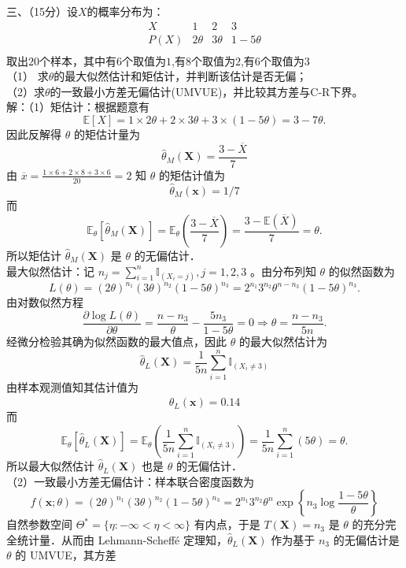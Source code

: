 \documentclass[UTF8]{ctexart}
\begin{document}
\noindent 三、（15分）设$X$的概率分布为：
\[
\begin{array}{c|ccc}
X & 1 & 2 & 3 \\ \hline
P(X) & 2\theta & 3\theta & 1-5\theta \\
\end{array}
\]
取出$20$个样本，其中有$6$个取值为$1$,有$8$个取值为$2$,有$6$个取值为$3$\\
（1） 求$\theta$的最大似然估计和矩估计，并判断该估计是否无偏；\\
（2）求$\theta$的一致最小方差无偏估计(UMVUE)，并比较其方差与C-R下界。\\
解：（1）矩估计：根据题意有
$$
\mathbb{E}[X]=1 \times 2 \theta+2 \times 3 \theta+3 \times(1-5 \theta)=3-7 \theta .
$$
因此反解得 $\theta$ 的矩估计量为
$$\hat{\theta}_M(\boldsymbol{X})=\frac{3-\overline{X}}{7}$$
由 $\overline{x}=\frac{1 \times 6+2 \times 8+3 \times 6}{20}=2$ 知 $\theta$ 的矩估计值为 
$$\hat{\theta}_M(\boldsymbol{x})=1 / 7$$ 而
$$
\mathbb{E}_\theta\left[\hat{\theta}_M(\boldsymbol{X})\right]=\mathbb{E}_\theta\left(\frac{3-\overline{X}}{7}\right)=\frac{3-\mathbb{E}(\overline{X})}{7}=\theta .
$$
所以矩估计 $\hat{\theta}_M(\boldsymbol{X})$ 是 $\theta$ 的无偏估计．\\
最大似然估计：记 $n_j=\sum_{i=1}^n \mathbb{I}_{\left(X_i=j\right)}, j=1,2,3$ 。由分布列知 $\theta$ 的似然函数为
$$
L(\theta)=(2 \theta)^{n_1}(3 \theta)^{n_2}(1-5 \theta)^{n_3}=2^{n_1} 3^{n_2} \theta^{n-n_3}(1-5 \theta)^{n_3} .
$$
由对数似然方程
$$
\frac{\partial \log L(\theta)}{\partial \theta}=\frac{n-n_3}{\theta}-\frac{5 n_3}{1-5 \theta}=0 \Rightarrow \theta=\frac{n-n_3}{5 n} .
$$
经微分检验其确为似然函数的最大值点，因此 $\theta$ 的最大似然估计为 $$\hat{\theta}_L(\boldsymbol{X})=\frac{1}{5 n} \sum_{i=1}^n \mathbb{I}_{\left(X_i \neq 3\right)}$$
由样本观测值知其估计值为 $$\hat{\theta}_L(\boldsymbol{x})=0.14$$
而
$$
\mathbb{E}_\theta\left[\hat{\theta}_L(\boldsymbol{X})\right]=\mathbb{E}_\theta\left(\frac{1}{5 n} \sum_{i=1}^n \mathbb{I}_{\left(X_i \neq 3\right)}\right) =\frac{1}{5 n} \sum_{i=1}^n(5 \theta)=\theta .
$$
所以最大似然估计 $\hat{\theta}_L(\boldsymbol{X})$ 也是 $\theta$ 的无偏估计．\\
（2）一致最小方差无偏估计：样本联合密度函数为
$$
f(\boldsymbol{x} ; \theta)=(2 \theta)^{n_1}(3 \theta)^{n_2}(1-5 \theta)^{n_3}=2^{n_1} 3^{n_2} \theta^n \exp \left\{n_3 \log \frac{1-5 \theta}{\theta}\right\}
$$
自然参数空间 $\Theta^*=\{\eta:-\infty<\eta<\infty\}$ 有内点，于是 $T(\boldsymbol{X})=n_3$ 是 $\theta$ 的充分完全统计量．从而由 Lehmann-Scheffé 定理知，$\hat{\theta}_L(\boldsymbol{X})$ 作为基于 $n_3$ 的无偏估计是 $\theta$ 的 UMVUE，其方差
\end{document}
